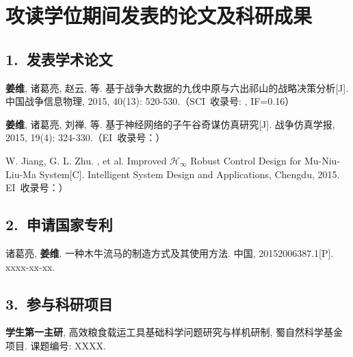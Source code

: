 \chapter*{攻读\cDegree{}学位期间发表的论文及科研成果}

\section*{1.~发表学术论文}
\begin{publist}
	\item \textbf{姜维}, 诸葛亮, 赵云, 等. 基于战争大数据的九伐中原与六出祁山的战略决策分析[J]. 中国战争信息物理, 2015, 40(13): 520-530.（SCI~收录号: , IF=0.16）
	\item \textbf{姜维}, 诸葛亮, 刘禅, 等. 基于神经网络的子午谷奇谋仿真研究[J]. 战争仿真学报, 2015, 19(4): 324-330.（EI~收录号：）
	\item W. Jiang, G. L. Zhu. , et al. Improved $\mathcal{H}_\infty$ Robust Control Design for Mu-Niu-Liu-Ma System[C]. Intelligent System Design and Applications, Chengdu, 2015. EI~收录号：）
\end{publist}

\section*{2.~申请国家专利}
\begin{publist}
	\item 诸葛亮, \textbf{姜维}. 一种木牛流马的制造方式及其使用方法. 中国, 20152006387.1[P]. xxxx-xx-xx.
\end{publist}

\section*{3.~参与科研项目}
\begin{publist}
	\item \textbf{学生第一主研}, 高效粮食载运工具基础科学问题研究与样机研制, 蜀自然科学基金项目. 课题编号: XXXX.
\end{publist}